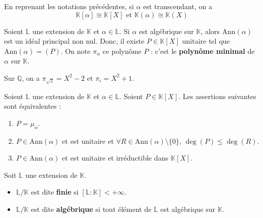 	\begin{proposition}
		En reprenant les notations précédentes, si $\alpha$ est transcendant, on a
		\[ \mathbb{K}[\alpha] \cong \mathbb{K}[X] \text{ et } \mathbb{K}(\alpha) \cong \mathbb{K}(X) \]
	\end{proposition}

	\begin{definition}
		Soient $\mathbb{L}$ une extension de $\mathbb{K}$ et $\alpha \in \mathbb{L}$. Si $\alpha$ est algébrique sur $\mathbb{K}$, alors $\mathrm{Ann}(\alpha)$ est un idéal principal non nul. Donc, il existe $P \in \mathbb{K}[X]$ unitaire tel que $\mathrm{Ann}(\alpha) = (P)$. On note $\pi_\alpha$ ce polynôme $P$ : c'est le \textbf{polynôme minimal} de $\alpha$ sur $\mathbb{K}$.
	\end{definition}

	\begin{example}
		Sur $\mathbb{Q}$, on a $\pi_{\sqrt{2}} = X^2 - 2$ et $\pi_i = X^2 + 1$.
	\end{example}


	\begin{proposition}
		Soient $\mathbb{L}$ une extension de $\mathbb{K}$ et $\alpha \in \mathbb{L}$. Soient $P \in \mathbb{K}[X]$. Les assertions suivantes sont équivalentes :
		\begin{enumerate}[label=(\roman*)]
			\item $P = \mu_\alpha$.
			\item $P \in \mathrm{Ann}(\alpha)$ et est unitaire et $\forall R \in \mathrm{Ann}(\alpha) \setminus \{ 0 \}, \, \deg(P) \leq \deg(R)$.
			\item $P \in \mathrm{Ann}(\alpha)$ et est unitaire et irréductible dans $\mathbb{K}[X]$.
		\end{enumerate}
	\end{proposition}


	\begin{definition}
		Soit $\mathbb{L}$ une extension de $\mathbb{K}$.
		\begin{itemize}
			\item $\mathbb{L}/\mathbb{K}$ est dite \textbf{finie} si $[\mathbb{L}:\mathbb{K}] < +\infty$.
			\item $\mathbb{L}/\mathbb{K}$ est dite \textbf{algébrique} si tout élément de $\mathbb{L}$ est algébrique sur $\mathbb{K}$.
		\end{itemize}
	\end{definition}


